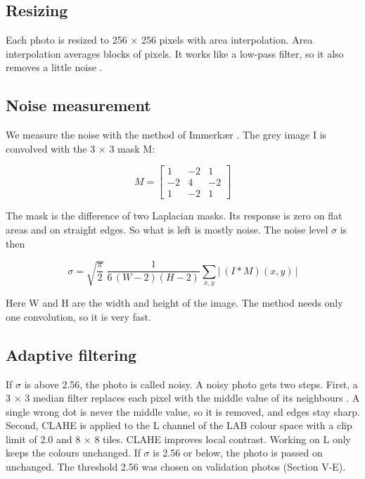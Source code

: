\documentclass[10pt,twocolumn,letterpaper]{article}
\begin{document}
\subsection{Resizing}
Each photo is resized to 256 $\times$ 256 pixels with area interpolation. Area interpolation averages blocks of pixels. It works like a low-pass filter, so it also removes a little noise \cite{gonzalez}.

\subsection{Noise measurement}
We measure the noise with the method of Immerkær \cite{immerkaer}. The grey image I is convolved with the 3 $\times$ 3 mask M:

\begin{equation}
  M=\begin{bmatrix}1&-2&1\\-2&4&-2\\1&-2&1\end{bmatrix}
\end{equation}

The mask is the difference of two Laplacian masks. Its response is zero on flat areas and on straight edges. So what is left is mostly noise. The noise level $\sigma$ is then

\begin{equation}
  \sigma=\sqrt{\frac{\pi}{2}}\;\frac{1}{6\,(W-2)(H-2)}\sum_{x,y}\left|\,(I*M)(x,y)\,\right|
\end{equation}

Here W and H are the width and height of the image. The method needs only one convolution, so it is very fast.

\subsection{Adaptive filtering}
If $\sigma$ is above 2.56, the photo is called noisy. A noisy photo gets two steps. First, a 3 $\times$ 3 median filter replaces each pixel with the middle value of its neighbours \cite{huang}. A single wrong dot is never the middle value, so it is removed, and edges stay sharp. Second, CLAHE \cite{clahe} is applied to the L channel of the LAB colour space with a clip limit of 2.0 and 8 $\times$ 8 tiles. CLAHE improves local contrast. Working on L only keeps the colours unchanged. If $\sigma$ is 2.56 or below, the photo is passed on unchanged. The threshold 2.56 was chosen on validation photos (Section V-E).
\end{document}
